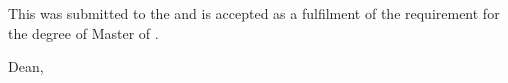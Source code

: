 \documentclass[12pt, a4paper, oneside]{memoir}
\begin{document}
\ifdefined\myCoSupervisor
  \ifdefined\myExaminer
    \newpage
  \fi
\fi

\noindent This \myDocument was submitted to the \myKulliyyah and 
is accepted as a fulfilment of the requirement for the degree of Master of 
\mySubject.\\[18pt]

\hfill \makebox[2in]{\dotfill}

\hfill \myKulliyahDean

\hfill Dean, \myKulliyyah\\

\setcounter{page}{\ApprovalPageMastersFolio}
\end{document}
